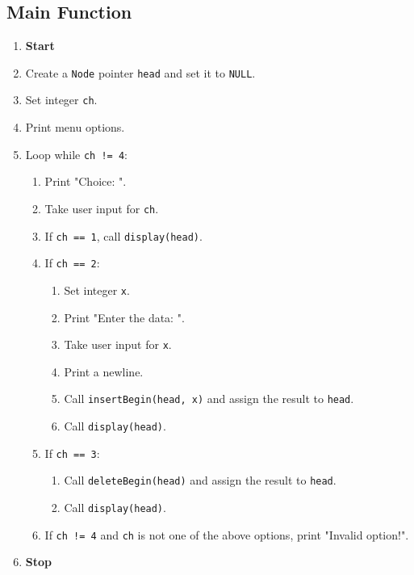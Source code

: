 {  \subsection{Main Function}
  \begin{enumerate}[label=\arabic*:,left=0pt]
    \item \textbf{Start}
    \item Create a \texttt{Node} pointer \texttt{head} and set it to \texttt{NULL}.
    \item Set integer \texttt{ch}.
    \item Print menu options.
    \item Loop while \texttt{ch != 4}:
          \begin{enumerate}[label=1.\arabic*:, start=1]
            \item Print "Choice: ".
            \item Take user input for \texttt{ch}.
            \item If \texttt{ch == 1}, call \texttt{display(head)}.
            \item If \texttt{ch == 2}:
                  \begin{enumerate}[label=3.\arabic*:, start=1]
                    \item Set integer \texttt{x}.
                    \item Print "Enter the data: ".
                    \item Take user input for \texttt{x}.
                    \item Print a newline.
                    \item Call \texttt{insertBegin(head, x)} and assign the result to \texttt{head}.
                    \item Call \texttt{display(head)}.
                  \end{enumerate}
            \item If \texttt{ch == 3}:
                  \begin{enumerate}[label=4.\arabic*:, start=1]
                    \item Call \texttt{deleteBegin(head)} and assign the result to \texttt{head}.
                    \item Call \texttt{display(head)}.
                  \end{enumerate}
            \item If \texttt{ch != 4} and \texttt{ch} is not one of the above options, print "Invalid option!".
          \end{enumerate}
    \item \textbf{Stop}
  \end{enumerate}
 }
